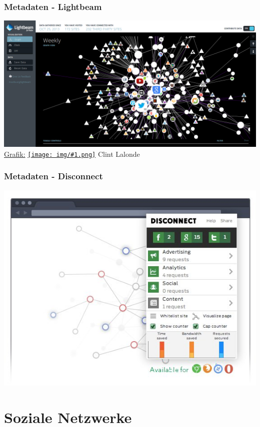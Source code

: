 \documentclass[12pt]{beamer}
\newcommand{\cc}[1]{\texttt{[image: img/\#1.png]}\hspace{1mm}}
\begin{document}
\begin{frame}
    \frametitle{Metadaten - Lightbeam}
    \includegraphics[height=0.7\textheight]{img/lightbeam.png}
  \\{\small \href{http://www.flickr.com/photos/8517757@N03/10538205035/in/photolist-h4e4dg}{Grafik:} \href{http://creativecommons.org/licenses/by-sa/3.0/deed.en}{\cc{by-sa}} Clint Lalonde}
\end{frame}

\begin{frame}
  \frametitle{Metadaten - Disconnect}
  \includegraphics[height=0.7\textheight]{img/disconnectme.jpg}
\end{frame}

\section{Soziale Netzwerke}
\subsection{}
\end{document}
